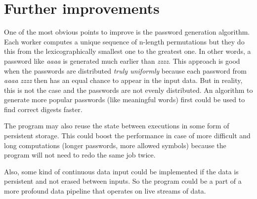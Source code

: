 \documentclass{article}
\begin{document}
\section{Further improvements}

One of the most obvious points to improve is the password generation algorithm. Each worker computes a unique sequence of n-length permutations but they do this from the lexicographically smallest one to the greatest one. In other words, a password like \emph{aaaa} is generated much earlier than \emph{zzzz}. This approach is good when the passwords are distributed \emph{truly uniformly} because each password from \emph{aaaa} \emph{zzzz} then has an equal chance to appear in the input data. But in reality, this is not the case and the passwords are not evenly distributed. An algorithm to generate more popular passwords (like meaningful words) first could be used to find correct digests faster.

The program may also reuse the state between executions in some form of persistent storage. This could boost the performance in case of more difficult and long computations (longer passwords, more allowed symbols) because the program will not need to redo the same job twice.

Also, some kind of continuous data input could be implemented if the data is persistent and not erased between inputs. So the program could be a part of a more profound data pipeline that operates on live streams of data.
\end{document}
